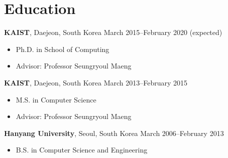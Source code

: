 \section*{Education}

\begin{description}
  \item {\bf KAIST}, Daejeon, South Korea \dotfill March 2015--February 2020 (expected)
  \begin{itemize}
  \item Ph.D. in School of Computing
  \item Advisor: Professor Seungryoul Maeng
  \end{itemize}
  
\item {\bf KAIST}, Daejeon, South Korea \dotfill March 2013--February 2015
  \begin{itemize}
  \item M.S. in Computer Science
  \item Advisor: Professor Seungryoul Maeng
  \end{itemize}

\item {\bf Hanyang University}, Seoul, South Korea \dotfill March 2006--February 2013
  \begin{itemize}
  \item B.S. in Computer Science and Engineering 
  \end{itemize}
\end{description}
